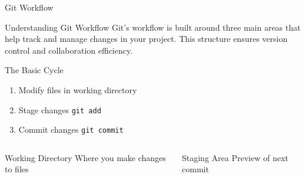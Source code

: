 \documentclass[aspectratio=169]{beamer}
\begin{document}
\begin{frame}{Git Workflow}
  \begin{block}{Understanding Git Workflow}
    Git's workflow is built around three main areas that help track and manage changes in your project. This structure ensures version control and collaboration efficiency.
  \end{block}

  \vspace{0.5em}
  \begin{block}{The Basic Cycle}
    \begin{enumerate}
      \item Modify files in working directory
      \item Stage changes \texttt{git add}
      \item Commit changes \texttt{git commit}
    \end{enumerate}
  \end{block}
  
  \begin{columns}
    \begin{column}{0.48\textwidth}
      \begin{block}{Working Directory}
        Where you make changes to files
      \end{block}
    \end{column}
    \begin{column}{0.48\textwidth}
      \begin{block}{Staging Area}
        Preview of next commit
      \end{block}
    \end{column}
  \end{columns}
  
  \vspace{1em}
\end{frame}
\end{document}
